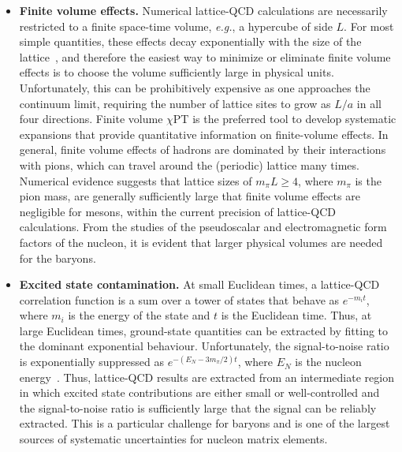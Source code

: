 \begin{itemize}
\item {\bfseries Finite volume effects.} Numerical lattice-QCD 
calculations are necessarily restricted to a finite space-time
volume, {\it e.g.}, a hypercube of side $L$.
%
For most simple quantities, these effects decay exponentially
with the size of the lattice~\cite{Luscher:1985dn,Luscher:1986pf}, and 
therefore the easiest way to
minimize or eliminate finite volume effects is to choose the volume
sufficiently large in physical units.
%
Unfortunately, this can be
prohibitively expensive as one approaches the continuum limit, requiring the
number of lattice sites to grow as $L/a$ in all four directions. 
%
Finite volume $\chi$PT is the preferred
tool to develop systematic expansions that provide quantitative
information on finite-volume effects.
%
In general, finite volume
effects of hadrons are dominated by their interactions with pions,
which can travel around the (periodic) lattice many times.
%
Numerical evidence suggests that lattice sizes of $m_\pi L \geq 4$, where
$m_\pi$ is the pion mass, are generally sufficiently large that finite
volume effects are negligible for mesons, within the current precision 
of lattice-QCD calculations.
%
From the studies of the pseudoscalar and electromagnetic form factors of the 
nucleon, it is evident that larger physical volumes are needed for the 
baryons.

\item {\bfseries Excited state contamination.} 
At small Euclidean times, a lattice-QCD correlation function
is a sum over a tower of states that behave as $e^{-m_it}$, where $m_i$ is the 
energy of the state and $t$ is the Euclidean time. 
%
Thus, at large Euclidean times,
ground-state quantities can be extracted by fitting to the dominant 
exponential behaviour.
%
Unfortunately, the signal-to-noise ratio is exponentially suppressed 
as $e^{-(E_N-3m_\pi/2)t}$, where $E_N$ is the nucleon energy~\cite{Lepage:1989hd}.
%
Thus, lattice-QCD results
are extracted from an intermediate region in which excited state contributions 
are either small or well-controlled and the signal-to-noise ratio is 
sufficiently large that the signal can be reliably extracted. 
%
This is a particular challenge for baryons and is one of the largest 
sources of systematic uncertainties for nucleon matrix elements.


\end{itemize}
